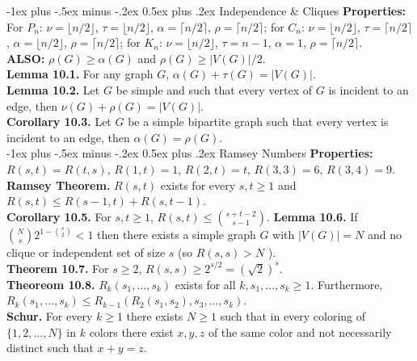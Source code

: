 \documentclass[10pt,landscape]{article}
\makeatletter
\renewcommand{\section}{\@startsection{section}{1}{0mm}%
                                {-1ex plus -.5ex minus -.2ex}%
                                {0.5ex plus .2ex}%
                                {\normalfont\large\bfseries}}
\makeatother
\begin{document}
\begin{multicols}{3}
\section{Independence \& Cliques}
\textbf{Properties:} For \( P_{n}  \): \( \nu = \lfloor n/2 \rfloor  \), \( \tau = \lfloor n / 2 \rfloor \), \( \alpha =\lceil n/2 \rceil \), \( \rho = \lceil n / 2 \rceil  \); for \( C_{n}  \): \( \nu = \lfloor n / 2 \rfloor  \), \( \tau = \lceil n / 2 \rceil  \), \( \alpha = \lfloor n / 2 \rfloor  \), \( \rho = \lceil n / 2 \rceil  \); for \( K_{n}  \): \( \nu = \lfloor n / 2 \rfloor  \), \( \tau = n - 1 \), \( \alpha = 1 \), \( \rho = \lceil n / 2 \rceil  \). \\
\textbf{ALSO:} \( \rho (G) \geq \alpha(G) \) and \( \rho (G) \geq |V(G)| / 2 \). \\
\textbf{Lemma 10.1.} For any graph \( G \), \( \alpha(G) + \tau(G) = |V(G)| \). \\
\textbf{Lemma 10.2.} Let \( G \) be simple and such that every vertex of \( G \) is incident to an edge, then \( \nu (G) + \rho (G) = |V(G)| \). \\
\textbf{Corollary 10.3.} Let \( G \) be a simple bipartite graph such that every vertex is incident to an edge, then \( \alpha(G) = \rho (G) \). \\
\section{Ramsey Numbers}
\textbf{Properties:} \( R(s,t) = R(t,s) \), \( R(1,t) = 1 \), \( R(2, t) = t \), \( R(3,3) = 6 \), \( R(3,4) = 9 \). \\
\textbf{Ramsey Theorem.} \( R(s,t) \) exists for every \( s,t \geq 1 \) and \( R(s,t) \leq R(s- 1, t) + R(s, t-1) \). \\
\textbf{Corollary 10.5.} For \( s, t \geq 1 \), \( R(s,t) \leq \binom{s + t - 2}{s - 1}  \).
\textbf{Lemma 10.6.} If \( \binom{N}{s} 2^{1 - \binom{s}{2} } < 1 \) then there exists a simple graph \( G \) with \( |V(G)| = N \) and no clique or independent set of size \( s \) (so \( R(s,s) > N \) ). \\
\textbf{Theorem 10.7.} For \( s \geq 2 \), \( R(s,s) \geq 2^{s / 2} = (\sqrt{2} )^{s}  \). \\
\textbf{Theoreom 10.8.} \( R_{k} (s_1, \hdots , s_{k} ) \) exists for all \( k, s_1, \hdots , s_{k} \geq 1  \). Furthermore, \( R_{k} (s_1, \hdots , s_{k} ) \leq R_{k - 1} (R_{2} (s_1, s_2), s_3, \hdots , s_{k} )  \). \\
\textbf{Schur.} For every \( k \geq 1 \) there exists \( N \geq 1 \) such that in every coloring of \( \{ 1, 2, \hdots , N \}  \) in \( k \) colors there exist \( x,y,z \) of the same color and not necessarily distinct such that \( x + y = z \). \\

\end{multicols}
\end{document}
